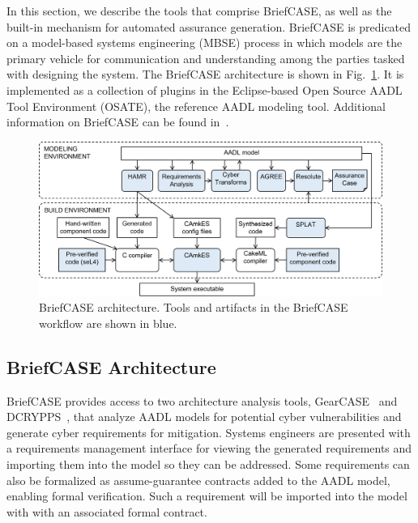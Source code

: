 In this section, we describe the tools that comprise BriefCASE, as well as the built-in mechanism for automated assurance generation.
BriefCASE is predicated on a model-based systems engineering (MBSE) process in which models are the primary vehicle for communication and understanding among the parties tasked with designing the system. 
The BriefCASE architecture is shown in Fig.~\ref{fig:briefcase-architecture}.
It is implemented as a collection of plugins in the Eclipse-based Open Source AADL Tool Environment (OSATE), the reference AADL modeling tool. 
Additional information on BriefCASE can be found in~\cite{case-at-scale}.





\begin{figure}[h] 
	\centering 
	\includegraphics[width=\textwidth]{figs/briefcase-architecture.png}
	\caption{BriefCASE architecture. Tools and artifacts in the BriefCASE workflow are shown in blue.}
	\label{fig:briefcase-architecture} 
\end{figure}

\subsection{BriefCASE Architecture}

BriefCASE provides access to two architecture analysis tools, GearCASE~\cite{gearcase2020} and DCRYPPS~\cite{dcrypps2019}, that analyze AADL models for potential cyber vulnerabilities and generate cyber requirements for mitigation. 
Systems engineers are presented with a requirements management interface for viewing the generated requirements and importing them into the model so they can be addressed.  
Some requirements can also be formalized as assume-guarantee contracts added to the AADL model, enabling formal verification. Such a requirement will be imported into the model with with an associated formal contract.

